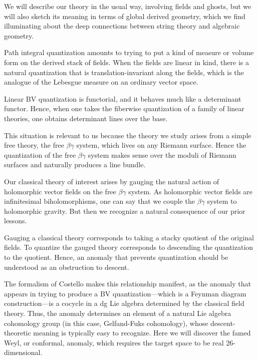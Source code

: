 We will describe our theory in the usual way, involving fields and ghosts, 
but we will also sketch its meaning in terms of global derived geometry,
which we find illuminating about the deep connections between string theory and algebraic geometry.

Path integral quantization amounts to trying to put a kind of measure or volume form on the derived stack of fields.
When the fields are linear in kind, 
there is a natural quantization that is translation-invariant along the fields,
which is the analogue of the Lebesgue measure on an ordinary vector space.

\begin{lesson}[\cite{GH}]
Linear BV quantization is functorial, and it behaves much like a determinant functor.
Hence, when one takes the fiberwise quantization of a family of linear theories,
one obtains determinant lines over the base.
\end{lesson}

This situation is relevant to us because the theory we study arises from a simple free theory,
the free $\beta\gamma$ system, which lives on any Riemann surface.
Hence the quantization of the free $\beta\gamma$ system makes sense over the moduli of Riemann surfaces and naturally produces a line bundle.

Our classical theory of interest arises by gauging the natural action of holomorphic vector fields on the free $\beta\gamma$ system.
As holomorphic vector fields are infinitesimal biholomorphisms, 
one can say that we couple the $\beta\gamma$ system to holomorphic gravity.
But then we recognize a natural consequence of our prior lessons.

\begin{lesson}
Gauging a classical theory corresponds to taking a stacky quotient of the original fields. 
To quantize the gauged theory corresponds to descending the quantization to the quotient.
Hence, an anomaly that prevents quantization should be understood as an obstruction to descent.
\end{lesson}

The formalism of Costello makes this relationship manifest, 
as the anomaly that appears in trying to produce a BV quantization---which is a Feynman diagram construction---is a cocycle in a dg Lie algebra determined by the classical field theory.
Thus, the anomaly determines an element of a natural Lie algebra cohomology group (in this case, Gelfand-Fuks cohomology),
whose descent-theoretic meaning is typically easy to recognize. 
Here we will discover the famed Weyl, or conformal, anomaly, which requires the target space to be real 26-dimensional. 

